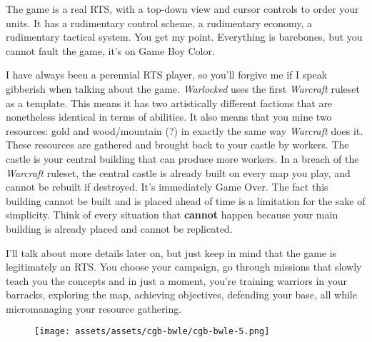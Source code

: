 \documentclass{book}
\begin{document}
The game is a real RTS, with a top-down view and cursor controls to order your units. It has a rudimentary control scheme, a rudimentary economy, a rudimentary tactical system. You get my point. Everything is barebones, but you cannot fault the game, it’s on Game Boy Color.

I have always been a perennial RTS player, so you’ll forgive me if I speak gibberish when talking about the game. \emph{Warlocked} uses the first \emph{Warcraft} ruleset as a template. This means it has two artistically different factions that are nonetheless identical in terms of abilities. It also means that you mine two resources: gold and wood/mountain (?) in exactly the same way \emph{Warcraft} does it. These resources are gathered and brought back to your castle by workers. The castle is your central building that can produce more workers. In a breach of the \emph{Warcraft} ruleset, the central castle is already built on every map you play, and cannot be rebuilt if destroyed. It’s immediately Game Over. The fact this building cannot be built and is placed ahead of time is a limitation for the sake of simplicity. Think of every situation that \textbf{cannot} happen because your main building is already placed and cannot be replicated.

I’ll talk about more details later on, but just keep in mind that the game is legitimately an RTS. You choose your campaign, go through missions that slowly teach you the concepts and in just a moment, you’re training warriors in your barracks, exploring the map, achieving objectives, defending your base, all while micromanaging your resource gathering.

\begin{figure}[hbt]
\vskip 10pt
\centering \texttt{[image: assets/assets/cgb-bwle/cgb-bwle-5.png]}
\vskip 6pt
\end{figure}
\end{document}
